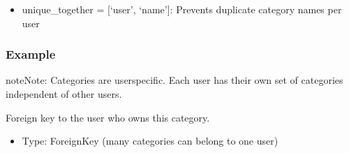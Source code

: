 \documentclass[letterpaper,10pt,english]{sphinxmanual}
\begin{document}
\begin{fulllineitems}
\begin{fulllineitems}
\end{fulllineitems}

\begin{description}
\begin{itemize}
\item {} 
\sphinxAtStartPar
unique\_together = {[}‘user’, ‘name’{]}: Prevents duplicate category names per user

\end{itemize}

\end{description}
\subsubsection*{Example}

\begin{sphinxVerbatim}[commandchars=\\\{\}]
  
    
    
    
\end{sphinxVerbatim}

\begin{sphinxadmonition}{note}{Note:}
\sphinxAtStartPar
Categories are user\sphinxhyphen{}specific. Each user has their own set of
categories independent of other users.
\end{sphinxadmonition}

\begin{fulllineitems}
\label{\detokenize{expensesApp:id10}}
\pysigstartsignatures
\pysigline
{}
\pysigstopsignatures
\sphinxAtStartPar
Foreign key to the user who owns this category.
\begin{description}
\begin{itemize}
\item {} 
\sphinxAtStartPar
Type: ForeignKey (many categories can belong to one user)


\end{itemize}
\end{description}
\end{fulllineitems}
\end{fulllineitems}
\end{document}
